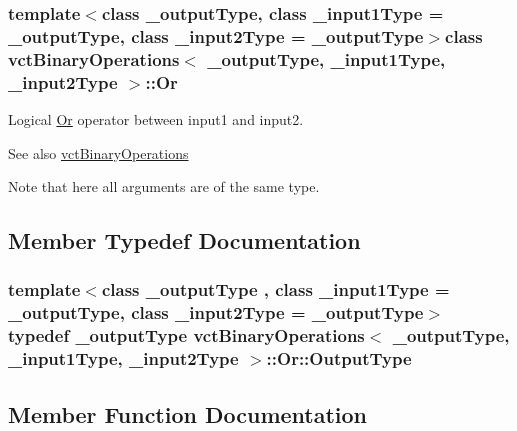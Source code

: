 \subsubsection*{template$<$class \+\_\+output\+Type, class \+\_\+input1\+Type = \+\_\+output\+Type, class \+\_\+input2\+Type = \+\_\+output\+Type$>$class vct\+Binary\+Operations$<$ \+\_\+output\+Type, \+\_\+input1\+Type, \+\_\+input2\+Type $>$\+::\+Or}

Logical \hyperlink{classvct_binary_operations_1_1_or}{Or} operator between input1 and input2. 

\begin{DoxySeeAlso}{See also}
\hyperlink{classvct_binary_operations}{vct\+Binary\+Operations}
\end{DoxySeeAlso}
Note that here all arguments are of the same type. 

\subsection{Member Typedef Documentation}
\hypertarget{classvct_binary_operations_1_1_or_a5401f56c720be18225261374125626f9}{}
\subsubsection[{Output\+Type}]{\setlength{\rightskip}{0pt plus 5cm}template$<$class \+\_\+output\+Type , class \+\_\+input1\+Type  = \+\_\+output\+Type, class \+\_\+input2\+Type  = \+\_\+output\+Type$>$ typedef \+\_\+output\+Type {\bf vct\+Binary\+Operations}$<$ \+\_\+output\+Type, \+\_\+input1\+Type, \+\_\+input2\+Type $>$\+::{\bf Or\+::\+Output\+Type}}\label{classvct_binary_operations_1_1_or_a5401f56c720be18225261374125626f9}


\subsection{Member Function Documentation}
\hypertarget{classvct_binary_operations_1_1_or_aa5370d181a9602330e386316eaa0d869}{}
